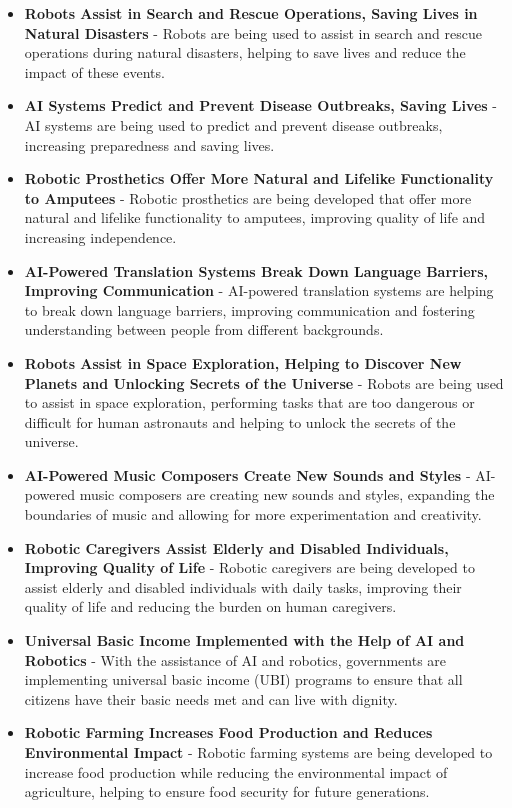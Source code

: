 \documentclass{article}
\begin{document}
\begin{itemize}
\item \textbf{Robots Assist in Search and Rescue Operations, Saving Lives in Natural Disasters} - Robots are being used to assist in search and rescue operations during natural disasters, helping to save lives and reduce the impact of these events.
\item \textbf{AI Systems Predict and Prevent Disease Outbreaks, Saving Lives} - AI systems are being used to predict and prevent disease outbreaks, increasing preparedness and saving lives.
\item \textbf{Robotic Prosthetics Offer More Natural and Lifelike Functionality to Amputees} - Robotic prosthetics are being developed that offer more natural and lifelike functionality to amputees, improving quality of life and increasing independence.
\item \textbf{AI-Powered Translation Systems Break Down Language Barriers, Improving Communication} - AI-powered translation systems are helping to break down language barriers, improving communication and fostering understanding between people from different backgrounds.
\item \textbf{Robots Assist in Space Exploration, Helping to Discover New Planets and Unlocking Secrets of the Universe} - Robots are being used to assist in space exploration, performing tasks that are too dangerous or difficult for human astronauts and helping to unlock the secrets of the universe.
\item \textbf{AI-Powered Music Composers Create New Sounds and Styles} - AI-powered music composers are creating new sounds and styles, expanding the boundaries of music and allowing for more experimentation and creativity.
\item \textbf{Robotic Caregivers Assist Elderly and Disabled Individuals, Improving Quality of Life} - Robotic caregivers are being developed to assist elderly and disabled individuals with daily tasks, improving their quality of life and reducing the burden on human caregivers.
\item \textbf{Universal Basic Income Implemented with the Help of AI and Robotics} - With the assistance of AI and robotics, governments are implementing universal basic income (UBI) programs to ensure that all citizens have their basic needs met and can live with dignity.
\item \textbf{Robotic Farming Increases Food Production and Reduces Environmental Impact} - Robotic farming systems are being developed to increase food production while reducing the environmental impact of agriculture, helping to ensure food security for future generations.

\end{itemize}
\end{document}

